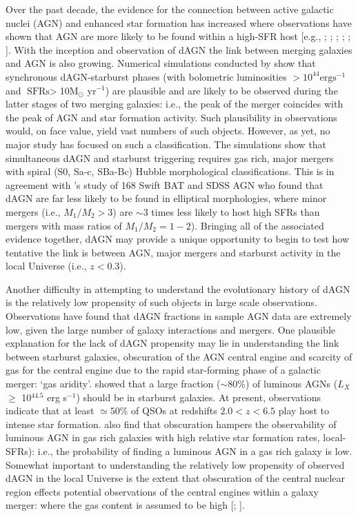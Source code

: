 Over the past decade, the evidence for the connection between active galactic nuclei (AGN) and enhanced star formation has increased where observations have shown that AGN are more likely to be found within a high-SFR host [e.g., \cite{2001ApJ...555..719C}; \cite{2004MNRAS.352..399J}; \cite{Sanchez_2004}; \cite{2006AJ....131...84V}; \cite{2006AJZakamska1496Z}; \cite{2011MNRASKaviraj}]. With the inception and observation of dAGN the link between merging galaxies and AGN is also growing. Numerical simulations conducted by \cite{Dotti_Bellovary_Callegari_2012} show that synchronous dAGN-starburst phases (with bolometric luminosities $>10^{44}\text{erg}\text{s}^{-1}$ and $\text{SFRs}>$10M$_{\odot}$ yr$^{-1}$) are plausible and are likely to be observed during the latter stages of two merging galaxies: i.e., the peak of the merger coincides with the peak of AGN and star formation activity. Such plausibility in observations would, on face value, yield vast numbers of such objects. However, as yet, no major study has focused on such a classification. The \cite{Dotti_Bellovary_Callegari_2012} simulations show that simultaneous dAGN and starburst triggering requires gas rich, major mergers with spiral (S0, Sa-c, SBa-Bc) Hubble morphological classifications. This is in agreement with \cite{Koss_2012}'s study of 168 Swift BAT and SDSS AGN who found that dAGN are far less likely to be found in elliptical morphologies, where minor mergers (i.e., $M_{1}/M_{2}>3$) are $\sim{3}$ times less likely to host high SFRs than mergers with mass ratios of $M_{1}/M_{2}={1-2}$). Bringing all of the associated evidence together, dAGN may provide a unique opportunity to begin to test how tentative the link is between AGN, major mergers and starburst activity in the local Universe (i.e., $z<{0.3}$).             

Another difficulty in attempting to understand the evolutionary history of dAGN is the relatively low propensity of such objects in large scale observations. Observations have found that dAGN fractions in sample AGN data are extremely low, given the large number of galaxy interactions and mergers. One plausible explanation for the lack of dAGN propensity may lie in understanding the link between starburst galaxies, obscuration of the AGN central engine and scarcity of gas for the central engine due to the rapid star-forming phase of a galactic merger: `gas aridity'. \cite{tini_Bongiorno_Piconcelli_2013} showed that a large fraction ($\sim{80}$\%) of luminous AGNs ($L_X$ $\ge$ 10$^{44.5}$ erg s$^{-1}$) should be in starburst galaxies. At present, observations indicate that at least $\simeq{50}$\% of QSOs at redshifts $2.0<z<6.5$ play host to intense star formation. \cite{tini_Bongiorno_Piconcelli_2013} also find that obscuration hampers the observability of luminous AGN in gas rich galaxies with high relative star formation rates, local-SFRs): i.e., the probability of finding a luminous AGN in a gas rich galaxy is low. Somewhat important to understanding the relatively low propensity of observed dAGN in the local Universe is the extent that obscuration of the central nuclear region effects potential observations of the central engines within a galaxy merger: where the gas content is assumed to be high [\cite{Levine_Gnedin_Hamilton_2010}; \cite{Dotti_Bellovary_Callegari_2012}].

